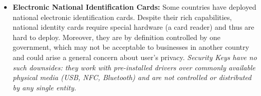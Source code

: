 \begin{itemize}
    \item \textbf{Electronic National Identification Cards:} Some countries have deployed
    national electronic identification cards. Despite their rich capabilities, national identity cards require special hardware (a card reader) and thus are hard to deploy. Moreover, they are by definition
    controlled by one government, which may not be acceptable to businesses in another country and could arise a general concern about user's privacy. \emph{Security Keys have no such downsides: they work with pre-installed drivers over commonly available physical media (USB, NFC, Bluetooth) and are not controlled or distributed by any single entity.}
\end{itemize}